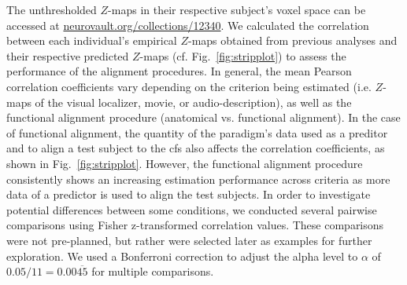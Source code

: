 %









The unthresholded $Z$-maps in their respective subject's voxel space can be
accessed at
\href{https://identifiers.org/neurovault.collection:12340}{\url{neurovault.org/collections/12340}}.
%
We calculated the correlation between each individual's empirical $Z$-maps
obtained from previous analyses \citep{haeusler2022processing,
sengupta2016extension} and their respective predicted $Z$-maps (cf.
Fig.~\ref{fig:stripplot}) to assess the performance of the alignment procedures.
%
In general, the mean Pearson correlation coefficients vary depending on the
criterion being estimated (i.e. $Z$-maps of the visual localizer, movie, or
audio-description), as well as the functional alignment procedure (anatomical
vs. functional alignment).
%
In the case of functional alignment, the quantity of the paradigm's data used as
a preditor and to align a test subject to the \ac{cfs} also affects the
correlation coefficients, as shown in Fig.~\ref{fig:stripplot}.
%
However, the functional alignment procedure consistently shows an increasing
estimation performance across criteria as more data of a predictor is used to
align the test subjects.
%
In order to investigate potential differences between some conditions, we
conducted several pairwise comparisons using Fisher z-transformed correlation
values.
%
These comparisons were not pre-planned, but rather were selected later as
examples for further exploration.
%
We used a Bonferroni correction to adjust the alpha level to $\alpha$ of $0.05 /
11 = 0.00\overline{45}$ for multiple comparisons.


